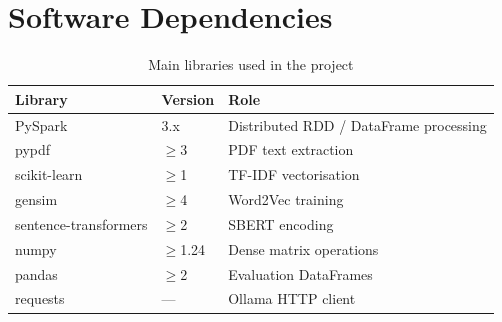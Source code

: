 \documentclass[a4paper,11pt]{article}
\begin{document}
\appendix
\section{Software Dependencies}

\begin{table}[H]
  \centering
  \caption{Main libraries used in the project}
  \begin{tabularx}{\linewidth}{llX}
    \toprule
    \textbf{Library} & \textbf{Version} & \textbf{Role} \\
    \midrule
    PySpark              & 3.x    & Distributed RDD / DataFrame processing \\
    pypdf                & $\geq$3 & PDF text extraction \\
    scikit-learn         & $\geq$1 & TF-IDF vectorisation \\
    gensim               & $\geq$4 & Word2Vec training \\
    sentence-transformers& $\geq$2 & SBERT encoding \\
    numpy                & $\geq$1.24 & Dense matrix operations \\
    pandas               & $\geq$2 & Evaluation DataFrames \\
    requests             & —      & Ollama HTTP client \\
    \bottomrule
  \end{tabularx}
\end{table}
\end{document}
